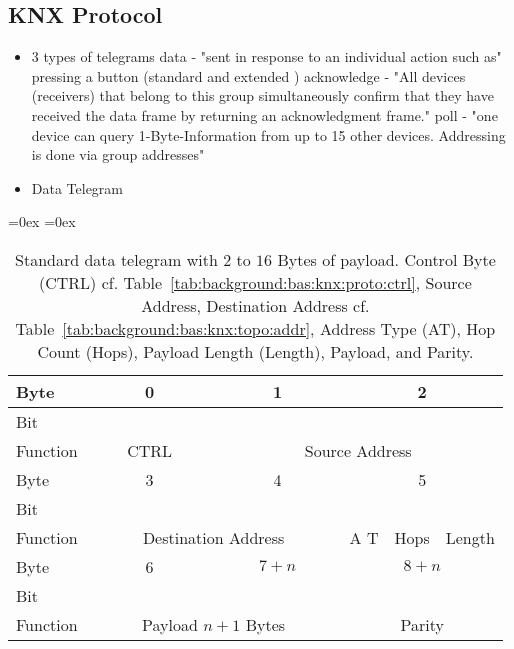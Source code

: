 	\subsection{KNX Protocol}
		\begin{itemize}
			\item 3 types of telegrams \parencite{Hubner2009} \parencite{Merz2009}
				\subitem data - "sent in response to an individual action such as" \parencite{Merz2009} pressing a button (standard and extended \parencite{Hubner2009})
				\subitem acknowledge - "All devices (receivers) that belong to this group simultaneously confirm that they have received the data frame by returning an acknowledgment frame." \parencite{Merz2009}
				\subitem poll - "one device can query 1-Byte-Information from up to 15 other devices. Addressing is done via group addresses" \parencite{Hubner2009}
			\item Data Telegram
				\subitem 
			
		\end{itemize}
	
		\begin{table}
			\aboverulesep=0ex
			\belowrulesep=0ex
			\renewcommand{\arraystretch}{1.2}
			
			\centering
			\begin{tabular}{|l|c|c|c|c|c|c|c|c|c|c|c|c|c|c|c|c|c|c|c|c|c|c|c|c|}
				\toprule
				Byte & \multicolumn{8}{c|}{0} & \multicolumn{8}{c|}{1} & \multicolumn{8}{c|}{2} \\\midrule
				Bit & & & & & & & & & & & & & & & & & & & & & & & & \\\midrule
				Function & \multicolumn{8}{c|}{CTRL} & \multicolumn{16}{c|}{Source Address} \\\bottomrule
				\toprule
				Byte & \multicolumn{8}{c|}{3} & \multicolumn{8}{c|}{4} & \multicolumn{8}{c|}{5} \\\midrule
				Bit & & & & & & & & & & & & & & & & & & & & & & & & \\\midrule
				Function & \multicolumn{16}{c|}{Destination Address} & \multicolumn{1}{c|}{\parbox[t][][t]{0.1cm}{A T}} & \multicolumn{3}{c|}{Hops} & \multicolumn{4}{c|}{Length} \\\bottomrule
				\toprule
				Byte & \multicolumn{8}{c|}{6} & \multicolumn{8}{c|}{$7+n$} & \multicolumn{8}{c|}{$8+n$} \\\midrule
				Bit & & & & & & & & & & & & & & & & & & & & & & & & \\\midrule
				Function & \multicolumn{16}{c|}{Payload $n+1$ Bytes} & \multicolumn{8}{c|}{Parity} \\\bottomrule
			\end{tabular}
			\caption[Standard \knx data telegram]{Standard \knx data telegram with $2$ to $16$ Bytes of payload. Control Byte (CTRL) cf. Table~\ref{tab:background:bas:knx:proto:ctrl}, Source Address, Destination Address cf. Table~\ref{tab:background:bas:knx:topo:addr}, Address Type (AT), Hop Count (Hops), Payload Length (Length), Payload, and Parity.}
			\label{tab:background:bas:knx:proto:knx-standard}
		\end{table}
	
